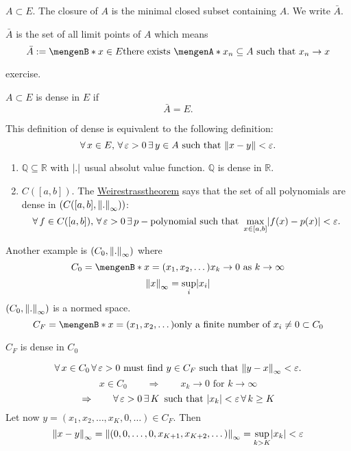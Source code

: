 \begin{definition*}[closure]
	$A \subset E$. The closure of $A$ is the minimal closed subset containing $A$. We write $\bar{A}$.
\end{definition*}
\begin{proposition*}
	$\bar{A}$ is the set of all limit points of $A$ which means
	\[
		\bar{A} := \set[x \in E]{\text{there exists $\set{x_n} \subseteq A$ such that $x_n \to x$}}
	\]
\end{proposition*}
\begin{beweis}
	exercise.
\end{beweis}
\begin{definition*}[dense]
	$A \subset E$ is dense in $E$ if 
	\[
		\bar{A} = E.
	\]
\end{definition*}
\begin{bemerkung}
	This definition of dense is equivalent to the following definition:
	\[
		\forall\, x \in E,\,\forall\, \varepsilon>0 \,\exists\,y \in A \text{ such that } \norm{x-y} < \varepsilon.
	\]
\end{bemerkung}
\begin{beispiele}
	\begin{enumerate}[1)]
		\item $\mathbb{Q} \subseteq \mathbb{R}$ with $\lvert.\rvert$ usual absolut value function. $\mathbb{Q}$ is dense in $\mathbb{R}$.
		\item $C([a,b])$. The \underline{Weirestrasstheorem} says that the set of all polynomials are dense in $(C([a,b],\norm{.}_{\infty}))$:
		\[
			\forall\, f \in C([a,b]),\,\forall\, \varepsilon>0 \,\exists\,p-\text{polynomial such that }\max_{x \in [a,b]}\lvert f(x)-p(x)\rvert < \varepsilon.
		\]
	\end{enumerate}
\end{beispiele}
Another example is $(C_0, \norm{.}_{\infty})$ where
		\[
			C_0 = \set[x = (x_1,x_2,\dots)]{x_k \to 0 \text{ as }k \to \infty}
		\]
		\[
			\norm{x}_{\infty}= \sup_{i}\abs{x_i}
		\]
		$(C_0,\norm{.}_{\infty})$ is a normed space. 
		\[
			C_F = \set[x = (x_1,x_2,\dots)]{\text{only a finite number of }x_i \neq 0} \subset C_0
		\]
\begin{satz}
	$C_F$ is dense in $C_0$
\end{satz}
\begin{beweis}
	\[
		\forall\,  x \in C_0 \,\forall\, \varepsilon>0 \text{ must find }y \in C_F \text{ such that }\norm{y-x}_{\infty} < \varepsilon.
	\]
	\[
		x \in C_0 \qquad \Rightarrow \qquad x_k \to 0 \text{ for }k \to \infty 
	\]
	\[
		\Rightarrow \qquad \forall\, \varepsilon >0 \,\exists\,K \,\text{ such that } \lvert x_k\rvert < \varepsilon \, \forall\, k \geq K
	\]
	Let now $y = (x_1,x_2, \dots,x_K, 0, \dots) \in C_F$. Then 
	\[
		\norm{x-y}_{\infty} = \norm{(0,0,\dots,0,x_{K+1},x_{K+2},\dots)}_{\infty} = \sup_{k >K}\abs{x_k} < \varepsilon
	\]
\end{beweis}
